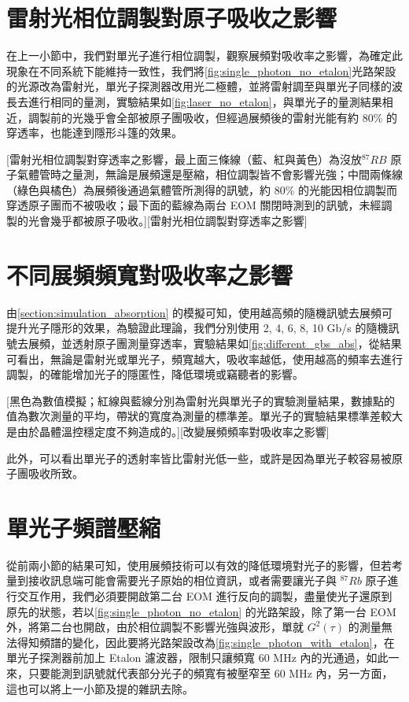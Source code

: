 \documentclass[class=NCU_thesis, crop=false]{standalone}
\begin{document}
\section{雷射光相位調製對原子吸收之影響}
在上一小節中，我們對單光子進行相位調製，觀察展頻對吸收率之影響，為確定此現象在不同系統下能維持一致性，我們將\cref{fig:single_photon_no_etalon}光路架設的光源改為雷射光，單光子探測器改用光二極體，並將雷射調至與單光子同樣的波長去進行相同的量測，實驗結果如\cref{fig:laser_no_etalon}，與單光子的量測結果相近，調製前的光幾乎會全部被原子團吸收，但經過展頻後的雷射光能有約 80\% 的穿透率，也能達到隱形斗篷的效果。

[雷射光相位調製對穿透率之影響，最上面三條線（藍、紅與黃色）為沒放$^{87}RB$ 原子氣體管時之量測，無論是展頻還是壓縮，相位調製皆不會影響光強；中間兩條線（綠色與橘色）為展頻後通過氣體管所測得的訊號，約 80\% 的光能因相位調製而穿透原子團而不被吸收；最下面的藍線為兩台 EOM 關閉時測到的訊號，未經調製的光會幾乎都被原子吸收。][雷射光相位調製對穿透率之影響]

\section{不同展頻頻寬對吸收率之影響}
由\cref{section:simulation_absorption} 的模擬可知，使用越高頻的隨機訊號去展頻可提升光子隱形的效果，為驗證此理論，我們分別使用 2, 4, 6, 8, 10 Gb/s 的隨機訊號去展頻，並透射原子團測量穿透率，實驗結果如\cref{fig:different_gbs_abs}，從結果可看出，無論是雷射光或單光子，頻寬越大，吸收率越低，使用越高的頻率去進行調製，的確能增加光子的隱匿性，降低環境或竊聽者的影響。

[黑色為數值模擬；紅線與藍線分別為雷射光與單光子的實驗測量結果，數據點的值為數次測量的平均，帶狀的寬度為測量的標準差。單光子的實驗結果標準差較大是由於晶體溫控穩定度不夠造成的。][改變展頻頻率對吸收率之影響]

此外，可以看出單光子的透射率皆比雷射光低一些，或許是因為單光子較容易被原子團吸收所致。

\section{單光子頻譜壓縮}

從前兩小節的結果可知，使用展頻技術可以有效的降低環境對光子的影響，但若考量到接收訊息端可能會需要光子原始的相位資訊，或者需要讓光子與 $^{87}Rb$ 原子進行交互作用，我們必須要開啟第二台 EOM 進行反向的調製，盡量使光子還原到原先的狀態，若以\cref{fig:single_photon_no_etalon} 的光路架設，除了第一台 EOM 外，將第二台也開啟，由於相位調製不影響光強與波形，單就 $G^{2}(\tau)$ 的測量無法得知頻譜的變化，因此要將光路架設改為\cref{fig:single_photon_with_etalon}，在單光子探測器前加上 Etalon 濾波器，限制只讓頻寬 60 MHz 內的光通過，如此一來，只要能測到訊號就代表部分光子的頻寬有被壓窄至 60 MHz 內，另一方面，這也可以將上一小節及提的雜訊去除。
\end{document}
